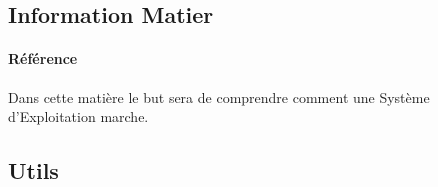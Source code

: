 \documentclass{article}
\begin{document}










\subsection{Information Matier}
\paragraph{Référence}Dans cette matière le but sera de comprendre comment une Système d'Exploitation marche.

\subsection{Utils}

\end{document}
